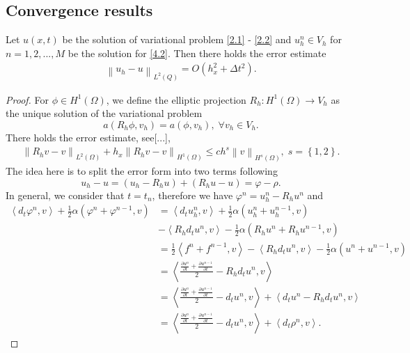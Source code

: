 \documentclass[]{article}
\begin{document}
\subsection{Convergence results}
\begin{dl}\label{dl3.2}
	Let $u(x, t)$ be the solution of variational problem \eqref{2.1} - \eqref{2.2} and $u^n_h\in V_h$ for $n=1, 2, ..., M$ be the solution for \eqref{4.2}. Then there holds the error estimate
	\begin{align}\label{3.6}
		\left\|u_h-u\right\|_{L^2(Q)}=O\left(h_x^2+\Delta t^2\right).
	\end{align}
\end{dl}
\begin{proof}
	For $\phi\in H^1(\Omega)$, we define the elliptic projection $R_h:H^1(\Omega)\to V_h$ as the unique solution of the variational problem
	$$a(R_h\phi, v_h)=a(\phi, v_h), \; \forall v_h\in V_h.$$
	There holds the error estimate, see[...],
	\begin{align}\label{ritz}
		\left\|R_hv-v\right\|_{L^2(\Omega)}+h_x\left\|R_hv-v\right\|_{H^1(\Omega)}\leq ch^s\left\|v\right\|_{H^s(\Omega)}, \; s=\left\{1, 2\right\}.
	\end{align}
	The idea here is to split the error form into two terms following
	$$u_h-u=\left(u_h-R_hu\right)+\left(R_hu-u\right)=\varphi-\rho.$$
	In general, we consider that $t=t_n$, therefore we have $\varphi^n=u^n_h-R_hu^n$ and %
	\begin{align*}
		\left\langle d_t\varphi^n, v\right\rangle +\frac{1}{2}\alpha(\varphi^n+\varphi^{n-1}, v)&=\left\langle d_tu^n_h, v\right\rangle+\frac{1}{2}\alpha(u^n_h+u^{n-1}_h, v)\\
		&-\left\langle R_hd_tu^n, v\right\rangle-\frac{1}{2}\alpha(R_hu^n+R_hu^{n-1}, v)\\
		&=\frac{1}{2}\left \langle f^n+f^{n-1},v\right\rangle -\left\langle R_hd_tu^n, v\right\rangle-\frac{1}{2}\alpha(u^n+u^{n-1}, v)\\
		&=\left\langle \frac{\frac{\partial u^n}{\partial t}+\frac{\partial u^{n-1}}{\partial t}}{2}-R_hd_tu^n, v\right\rangle\\
		&=\left\langle \frac{\frac{\partial u^n}{\partial t}+\frac{\partial u^{n-1}}{\partial t}}{2}-d_tu^n, v\right\rangle+\left\langle d_tu^n-R_hd_tu^n, v\right\rangle\\
		&=\left\langle \frac{\frac{\partial u^n}{\partial t}+\frac{\partial u^{n-1}}{\partial t}}{2}-d_tu^n, v\right\rangle+\left\langle d_t\rho^n, v\right\rangle.

\end{align*}
\end{proof}
\end{document}
